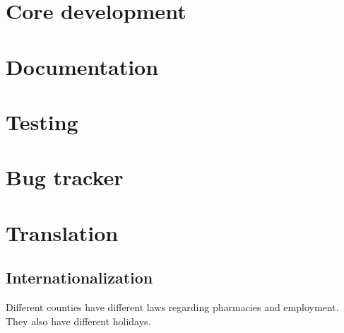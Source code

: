 \documentclass[12pt,a4paper,titlepage]{book}
\begin{document}
\section{Core development}
\section{Documentation}
\section{Testing}
\section{Bug tracker}
\section{Translation}
\subsection{Internationalization}
Different counties have different laws regarding pharmacies and employment. They also have different holidays.
\end{document}
